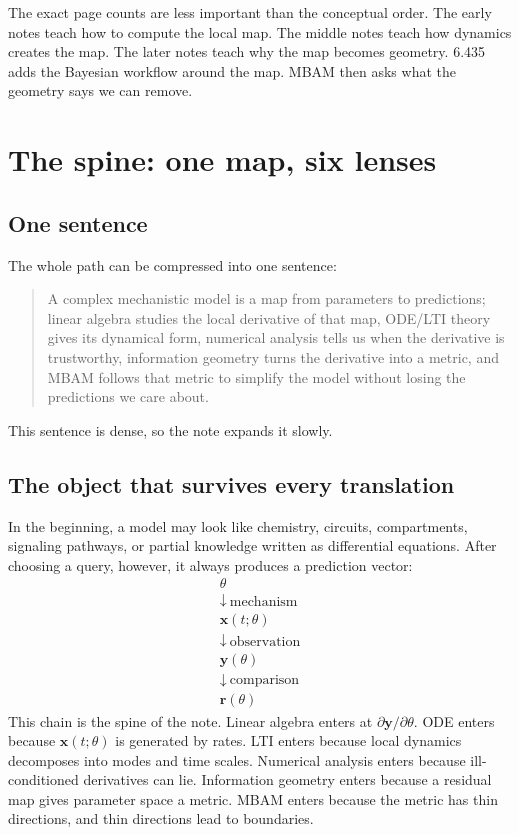 \documentclass[a4paper]{article}
\newcommand{\vect}[1]{\mathbf{#1}}
\newcommand{\param}{\theta}
\begin{document}
The exact page counts are less important than the conceptual order.  The early notes teach how to compute the local map.  The middle notes teach how dynamics creates the map.  The later notes teach why the map becomes geometry.  6.435 adds the Bayesian workflow around the map.  MBAM then asks what the geometry says we can remove.

\section{The spine: one map, six lenses}

\subsection{One sentence}

The whole path can be compressed into one sentence:
\begin{quote}
  A complex mechanistic model is a map from parameters to predictions; linear algebra studies the local derivative of that map, ODE/LTI theory gives its dynamical form, numerical analysis tells us when the derivative is trustworthy, information geometry turns the derivative into a metric, and MBAM follows that metric to simplify the model without losing the predictions we care about.
\end{quote}

This sentence is dense, so the note expands it slowly.

\subsection{The object that survives every translation}

In the beginning, a model may look like chemistry, circuits, compartments, signaling pathways, or partial knowledge written as differential equations.  After choosing a query, however, it always produces a prediction vector:
\[
  \begin{array}{c}
    \param\\
    \downarrow\ \text{mechanism}\\
    \vect{x}(t;\param)\\
    \downarrow\ \text{observation}\\
    \vect{y}(\param)\\
    \downarrow\ \text{comparison}\\
    \vect{r}(\param)
  \end{array}
\]
This chain is the spine of the note.  Linear algebra enters at \(\partial\vect{y}/\partial\param\).  ODE enters because \(\vect{x}(t;\param)\) is generated by rates.  LTI enters because local dynamics decomposes into modes and time scales.  Numerical analysis enters because ill-conditioned derivatives can lie.  Information geometry enters because a residual map gives parameter space a metric.  MBAM enters because the metric has thin directions, and thin directions lead to boundaries.
\end{document}
